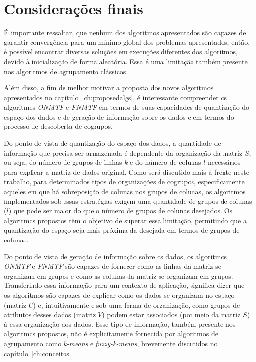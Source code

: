 \documentclass[
    12pt,                %
    oneside,            %
    a4paper,            %
    english,            %
    brazil                %
    ]{abntex2ppgsi}
\begin{document}

\section{Considerações finais}


É importante ressaltar, que nenhum dos algoritmos apresentados são capazes de garantir convergência para um mínimo global dos problemas apresentados, então, é possível encontrar diversas soluções em execuções diferentes dos algoritmos, devido à inicialização de forma aleatória.
Essa é uma limitação também presente nos algoritmos de agrupamento clássicos.

Além disso, a fim de melhor motivar a proposta dos novos algoritmos apresentados no capítulo~\ref{ch:proposedalgs}, é interessante compreender os algoritmos \textit{ONMTF} e \textit{FNMTF} em termos de suas capacidades de quantização do espaço dos dados e de geração de informação sobre os dados e em termos do processo de descoberta de cogrupos.

Do ponto de vista de quantização do espaço dos dados, a quantidade de informação que precisa ser armazenada é dependente da organização da matriz $S$, ou seja, do número de grupos de linhas $k$ e do número de colunas $l$ necessários para explicar a matriz de dados original.
Como será discutido mais à frente neste trabalho, para determinados tipos de organizações de cogrupos, especificamente aqueles em que há sobreposição de colunas nos grupos de colunas, os algoritmos implementados sob essas estratégias exigem uma quantidade de grupos de colunas ($l$) que pode ser maior do que o número de grupos de colunas desejados.
Os algoritmos propostos têm o objetivo de superar essa limitação, permitindo que a quantização do espaço seja mais próxima da desejada em termos de grupos de colunas.

Do ponto de vista de geração de informação sobre os dados, os algoritmos \textit{ONMTF} e \textit{FNMTF} são capazes de fornecer como as linhas da matriz se organizam em grupos e como as colunas da matriz se organizam em grupos.
Transferindo essa informação para um contexto de aplicação, significa dizer que os algoritmos são capazes de explicar como os dados se organizam no espaço (matriz $U$) e, intuitivamente e sob uma forma de organização, como grupos de atributos desses dados (matriz $V$) podem estar associados (por meio da matriz $S$) à essa organização dos dados.
Esse tipo de informação, também presente nos algoritmos propostos, não é explicitamente fornecida por algoritmos de agrupamento como \textit{k-means} e \textit{fuzzy-k-means}, brevemente discutidos no capítulo~\ref{ch:conceitos}.
\end{document}
